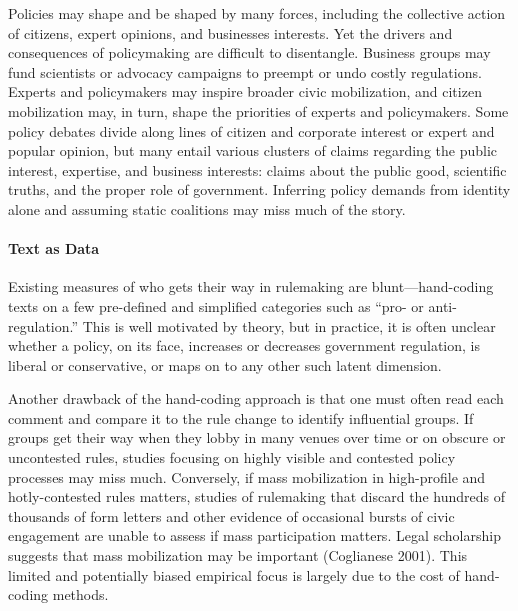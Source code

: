 Policies may shape and be shaped by many forces, including the collective action of citizens, expert opinions, and businesses interests. Yet the drivers and consequences of policymaking are difficult to disentangle. Business groups may fund scientists or advocacy campaigns to preempt or undo costly regulations. Experts and policymakers may inspire broader civic mobilization, and citizen mobilization may, in turn, shape the priorities of experts and policymakers. Some policy debates divide along lines of citizen and corporate interest or expert and popular opinion, but many entail various clusters of claims regarding the public interest, expertise, and business interests: claims about the public good, scientific truths, and the proper role of government. Inferring policy demands from identity alone and assuming static coalitions may miss much of the story. 

\paragraph{Text as Data}
Existing measures of who gets their way in rulemaking are blunt---hand-coding texts on a few pre-defined and simplified categories such as ``pro- or anti-regulation.'' This is well motivated by theory, but in practice, it is often unclear whether a policy, on its face, increases or decreases government regulation, is liberal or conservative, or maps on to any other such latent dimension. 

Another drawback of the hand-coding approach is that one must often read each comment and compare it to the rule change to identify influential groups. If groups get their way when they lobby in many venues over time or on obscure or uncontested rules, studies focusing on highly visible and contested policy processes may miss much. Conversely, if mass mobilization in high-profile and hotly-contested rules matters, studies of rulemaking that discard the hundreds of thousands of form letters and other evidence of occasional bursts of civic engagement are unable to assess if mass participation matters. Legal scholarship suggests that mass mobilization may be important (Coglianese 2001). This limited and potentially biased empirical focus is largely due to the cost of hand-coding methods.

